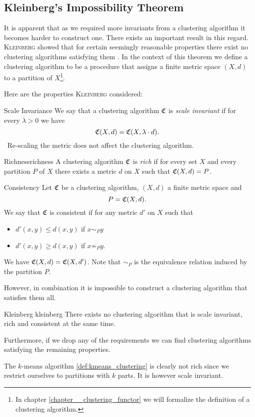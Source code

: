 \subsection{Kleinberg's Impossibility Theorem}
It is apparent that as we required more invariants from a clustering algorithm it becomes harder to construct one.
There exists an important result in this regard.
\textsc{Kleinberg} showed that for certain seemingly reasonable properties there exist no clustering algorithms satisfying them \cite{Kleinberg2002}.
In the context of this theorem we define a clustering algorithm to be a procedure that assigns a finite metric space $(X,d)$ to a partition of $X$\footnote{In chapter \ref{chapter__clustering_functor} we will formalize the definition of a clustering algorithm.}.

Here are the properties \textsc{Kleinberg} considered:

\begin{definition}{Scale Invariance}{}
We say that a clustering algorithm $\mathfrak{C}$ is \emph{scale invariant} if for every $\lambda > 0$ we have
$$
\mathfrak{C}(X,d) = \mathfrak{C}(X, \lambda \cdot d).
$$
\Ie\ Re-scaling the metric does not affect the clustering algorithm.
\end{definition}

\begin{definition}{Richness}{richness}
A clustering algorithm $\mathfrak{C}$ is \emph{rich} if for every set $X$ and every partition $P$ of $X$ there exists a metric $d$ on $X$ such that $\mathfrak{C}(X,d) = P$.
\end{definition}

\begin{definition}{Consistency}{}
Let $\mathfrak{C}$ be a clustering algorithm, $(X,d)$ a finite metric space and
$$
P = \mathfrak{C}(X,d).
$$
We say that $\mathfrak{C}$ is consistent if for any metric $d'$ on $X$ such that
\begin{itemize}
    \item $d'(x,y) \leq d(x,y)$ if $x\sim_P y$
    \item $d'(x,y) \geq d(x,y)$ if $x \not\sim_P y$.
\end{itemize}
We have $\mathfrak{C}(X,d) = \mathfrak{C}(X,d')$. Note that $\sim_P$ is the equivalence relation induced by the partition $P$.
\end{definition}


However, in combination it is impossible to construct a clustering algorithm that satisfies them all.


\begin{theorem}{Kleinberg \cite[Theorem~2.1]{Kleinberg2002}}{kleinberg}
There exists no clustering algorithm that is scale invariant, rich and consistent at the same time.
\end{theorem}

Furthermore, if we drop any of the requirements we can find clustering algorithms satisfying the remaining properties.

The $k$-means algorithm \ref{def:kmeans_clustering} is clearly not rich since we restrict ourselves to partitions with $k$ parts. It is however scale invariant.

